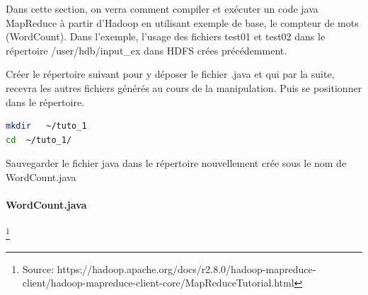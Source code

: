 \documentclass[12pt,french]{book}
\begin{document}
Dans cette section, on verra comment compiler et exécuter un code java MapReduce à partir d’Hadoop en utilisant exemple de base, le compteur de mots (WordCount).   Dans l’exemple, l’usage des fichiers test01 et test02 dans le répertoire /user/hdb/input\_ex dans HDFS crées précédemment.  

Créer le répertoire suivant pour y déposer le fichier .java et qui par la suite, recevra les autres fichiers générés au cours de la manipulation. Puis se positionner dans le répertoire.

\begin{lstlisting}[language=bash, frame=single]
mkdir   ~/tuto_1
cd  ~/tuto_1/
\end{lstlisting}

Sauvegarder le fichier java dans le répertoire nouvellement crée sous le nom de WordCount.java


\paragraph{WordCount.java} \footnote{Source: https://hadoop.apache.org/docs/r2.8.0/hadoop-mapreduce-client/hadoop-mapreduce-client-core/MapReduceTutorial.html}
\end{document}
